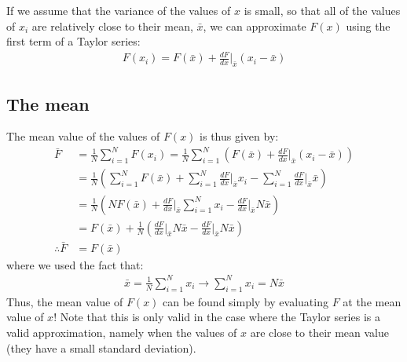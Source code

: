 If we assume that the variance of the values of $x$ is small, so that all of the values of $x_i$ are relatively close to their mean, $\bar x$, we can approximate $F(x)$ using the first term of a Taylor series:
\begin{align}
F(x_i) = F(\bar x)+\frac{dF}{dx}\biggr\rvert_{\bar x}(x_i-\bar x)
\end{align}

\subsection{The mean}
The mean value of the values of $F(x)$ is thus given by:
\begin{align}
\bar F &= \frac{1}{N}\sum_{i=1}^{N}F(x_i) = \frac{1}{N}\sum_{i=1}^{N} \left(F(\bar x)+\frac{dF}{dx}\biggr\rvert_{\bar x}(x_i-\bar x)\right)\nonumber\\
&=\frac{1}{N}\left(\sum_{i=1}^{N} F(\bar x) + \sum_{i=1}^{N}\frac{dF}{dx}\biggr\rvert_{\bar x}x_i - \sum_{i=1}^{N}\frac{dF}{dx}\biggr\rvert_{\bar x}\bar x\right)\nonumber\\
&=\frac{1}{N}\left(N F(\bar x) + \frac{dF}{dx}\biggr\rvert_{\bar x}\sum_{i=1}^{N}x_i - \frac{dF}{dx}\biggr\rvert_{\bar x}N\bar x\right)\nonumber\\
&=F(\bar x) + \frac{1}{N}\left(\frac{dF}{dx}\biggr\rvert_{\bar x}N\bar x - \frac{dF}{dx}\biggr\rvert_{\bar x}N\bar x\right)\nonumber\\
\therefore \bar F&=F(\bar x)
\end{align} where we used the fact that:
\begin{align*}
\bar x = \frac{1}{N} \sum_{i=1}^{N}x_i \to \sum_{i=1}^{N}x_i = N\bar x
\end{align*}
Thus, the mean value of $F(x)$ can be found simply by evaluating $F$ at the mean value of $x$! Note that this is only valid in the case where the Taylor series is a valid approximation, namely when the values of $x$ are close to their mean value (they have a small standard deviation).  
